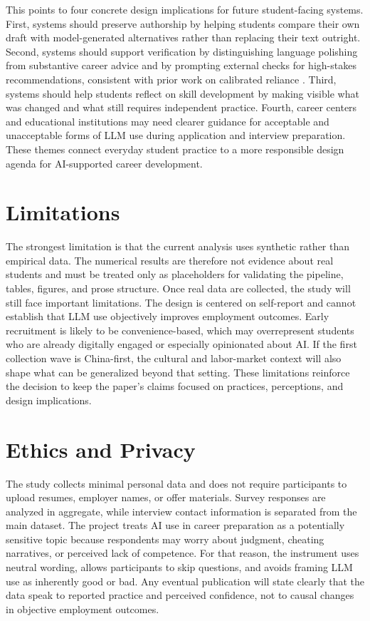 \documentclass[sigconf]{acmart}
\begin{document}
This points to four concrete design implications for future student-facing systems. First, systems should preserve authorship by helping students compare their own draft with model-generated alternatives rather than replacing their text outright. Second, systems should support verification by distinguishing language polishing from substantive career advice and by prompting external checks for high-stakes recommendations, consistent with prior work on calibrated reliance \cite{schemmer2023appropriatereliance}. Third, systems should help students reflect on skill development by making visible what was changed and what still requires independent practice. Fourth, career centers and educational institutions may need clearer guidance for acceptable and unacceptable forms of LLM use during application and interview preparation. These themes connect everyday student practice to a more responsible design agenda for AI-supported career development.

\section{Limitations}
The strongest limitation is that the current analysis uses synthetic rather than empirical data. The numerical results are therefore not evidence about real students and must be treated only as placeholders for validating the pipeline, tables, figures, and prose structure. Once real data are collected, the study will still face important limitations. The design is centered on self-report and cannot establish that LLM use objectively improves employment outcomes. Early recruitment is likely to be convenience-based, which may overrepresent students who are already digitally engaged or especially opinionated about AI. If the first collection wave is China-first, the cultural and labor-market context will also shape what can be generalized beyond that setting. These limitations reinforce the decision to keep the paper's claims focused on practices, perceptions, and design implications.

\section{Ethics and Privacy}
The study collects minimal personal data and does not require participants to upload resumes, employer names, or offer materials. Survey responses are analyzed in aggregate, while interview contact information is separated from the main dataset. The project treats AI use in career preparation as a potentially sensitive topic because respondents may worry about judgment, cheating narratives, or perceived lack of competence. For that reason, the instrument uses neutral wording, allows participants to skip questions, and avoids framing LLM use as inherently good or bad. Any eventual publication will state clearly that the data speak to reported practice and perceived confidence, not to causal changes in objective employment outcomes.
\end{document}
